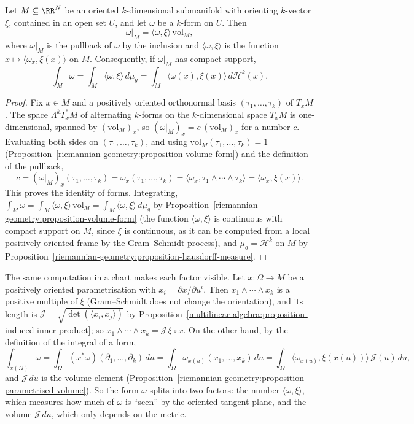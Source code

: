 \begin{proposition}\label{riemannian-geometry:proposition-orienting-vector}
Let $M \subseteq \RR^N$ be an oriented $k$-dimensional submanifold with orienting $k$-vector $\xi$, contained in an open set $U$, and let $\omega$ be a $k$-form on $U$. Then
\[
\omega|_M = \langle\omega, \xi\rangle\,\mathrm{vol}_M,
\]
where $\omega|_M$ is the pullback of $\omega$ by the inclusion and $\langle\omega, \xi\rangle$ is the function $x \mapsto \langle\omega_x, \xi(x)\rangle$ on $M$. Consequently, if $\omega|_M$ has compact support,
\[
\int_M\omega = \int_M\langle\omega, \xi\rangle\,d\mu_g = \int_M\langle\omega(x), \xi(x)\rangle\,d\mathcal{H}^k(x).
\]
\end{proposition}

\begin{proof}
Fix $x \in M$ and a positively oriented orthonormal basis $(\tau_1, \ldots, \tau_k)$ of $T_xM$. The space $\Lambda^kT^*_xM$ of alternating $k$-forms on the $k$-dimensional space $T_xM$ is one-dimensional,
spanned by $(\mathrm{vol}_M)_x$, so $(\omega|_M)_x = c\,(\mathrm{vol}_M)_x$ for a number $c$. Evaluating both sides on $(\tau_1, \ldots, \tau_k)$, and using $\mathrm{vol}_M(\tau_1, \ldots, \tau_k) = 1$
(Proposition~\ref{riemannian-geometry:proposition-volume-form}) and the definition of the pullback,
\[
c = (\omega|_M)_x(\tau_1, \ldots, \tau_k) = \omega_x(\tau_1, \ldots, \tau_k) = \langle\omega_x, \tau_1 \wedge \cdots \wedge \tau_k\rangle = \langle\omega_x, \xi(x)\rangle .
\]
This proves the identity of forms. Integrating, $\int_M\omega = \int_M\langle\omega, \xi\rangle\,\mathrm{vol}_M = \int_M\langle\omega, \xi\rangle\,d\mu_g$ by Proposition~\ref{riemannian-geometry:proposition-volume-form}
(the function $\langle\omega, \xi\rangle$ is continuous with compact support on $M$, since $\xi$ is continuous, as it can be computed from a local positively oriented frame by the Gram--Schmidt process), and
$\mu_g = \mathcal{H}^k$ on $M$ by Proposition~\ref{riemannian-geometry:proposition-hausdorff-measure}.
\end{proof}

The same computation in a chart makes each factor visible. Let $x \colon \Omega \to M$ be a positively oriented parametrisation with $x_i = \partial x/\partial u^i$. Then $x_1 \wedge \cdots \wedge x_k$ is a
positive multiple of $\xi$ (Gram--Schmidt does not change the orientation), and its length is $\mathcal{J} = \sqrt{\det(\langle x_i, x_j\rangle)}$ by Proposition~\ref{multilinear-algebra:proposition-induced-inner-product}; so
$x_1 \wedge \cdots \wedge x_k = \mathcal{J}\,\xi \circ x$. On the other hand, by the definition of the integral of a form,
\[
\int_{x(\Omega)}\omega = \int_\Omega(x^*\omega)(\partial_1, \ldots, \partial_k)\,du = \int_\Omega\omega_{x(u)}(x_1, \ldots, x_k)\,du = \int_\Omega\langle\omega_{x(u)}, \xi(x(u))\rangle\,\mathcal{J}(u)\,du,
\]
and $\mathcal{J}\,du$ is the volume element (Proposition~\ref{riemannian-geometry:proposition-parametrised-volume}). So the form $\omega$ splits into two factors: the number $\langle\omega, \xi\rangle$, which measures how much of
$\omega$ is ``seen'' by the oriented tangent plane, and the volume $\mathcal{J}\,du$, which only depends on the metric.

